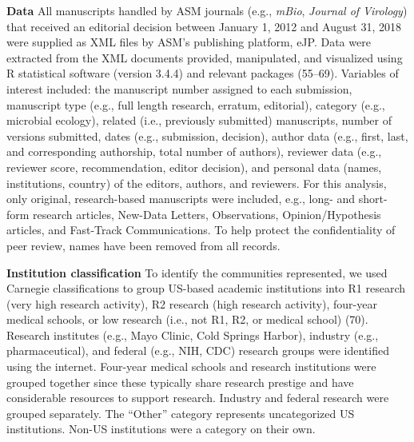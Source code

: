 \documentclass[11pt,]{article}
\begin{document}
\textbf{Data} All manuscripts handled by ASM journals (e.g.,
\emph{mBio}, \emph{Journal of Virology}) that received an editorial
decision between January 1, 2012 and August 31, 2018 were supplied as
XML files by ASM's publishing platform, eJP. Data were extracted from
the XML documents provided, manipulated, and visualized using R
statistical software (version 3.4.4) and relevant packages (55--69).
Variables of interest included: the manuscript number assigned to each
submission, manuscript type (e.g., full length research, erratum,
editorial), category (e.g., microbial ecology), related (i.e.,
previously submitted) manuscripts, number of versions submitted, dates
(e.g., submission, decision), author data (e.g., first, last, and
corresponding authorship, total number of authors), reviewer data (e.g.,
reviewer score, recommendation, editor decision), and personal data
(names, institutions, country) of the editors, authors, and reviewers.
For this analysis, only original, research-based manuscripts were
included, e.g., long- and short-form research articles, New-Data
Letters, Observations, Opinion/Hypothesis articles, and Fast-Track
Communications. To help protect the confidentiality of peer review,
names have been removed from all records.

\textbf{Institution classification} To identify the communities
represented, we used Carnegie classifications to group US-based academic
institutions into R1 research (very high research activity), R2 research
(high research activity), four-year medical schools, or low research
(i.e., not R1, R2, or medical school) (70). Research institutes (e.g.,
Mayo Clinic, Cold Springs Harbor), industry (e.g., pharmaceutical), and
federal (e.g., NIH, CDC) research groups were identified using the
internet. Four-year medical schools and research institutions were
grouped together since these typically share research prestige and have
considerable resources to support research. Industry and federal
research were grouped separately. The ``Other'' category represents
uncategorized US institutions. Non-US institutions were a category on
their own.
\end{document}
